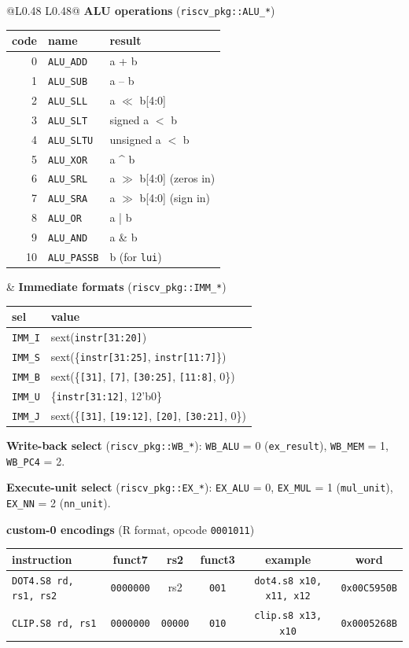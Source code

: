 \documentclass[10pt]{article}
\newcommand{\sv}[1]{\texttt{#1}}
\begin{document}
\bigskip
\noindent\begin{tabular}{@{}L{0.48\linewidth} L{0.48\linewidth}@{}}
\textbf{ALU operations} (\sv{riscv\_pkg::ALU\_*})\par\smallskip
\small
\begin{tabular}{r l l}
\toprule
code & name & result\\ \midrule
0 & \sv{ALU\_ADD}  & a + b\\
1 & \sv{ALU\_SUB}  & a -- b\\
2 & \sv{ALU\_SLL}  & a $\ll$ b[4:0]\\
3 & \sv{ALU\_SLT}  & signed a $<$ b\\
4 & \sv{ALU\_SLTU} & unsigned a $<$ b\\
5 & \sv{ALU\_XOR}  & a \^{} b\\
6 & \sv{ALU\_SRL}  & a $\gg$ b[4:0] (zeros in)\\
7 & \sv{ALU\_SRA}  & a $\gg$ b[4:0] (sign in)\\
8 & \sv{ALU\_OR}   & a | b\\
9 & \sv{ALU\_AND}  & a \& b\\
10& \sv{ALU\_PASSB}& b (for \sv{lui})\\ \bottomrule
\end{tabular}
&
\textbf{Immediate formats} (\sv{riscv\_pkg::IMM\_*})\par\smallskip
\small
\begin{tabular}{l l}
\toprule
sel & value\\ \midrule
\sv{IMM\_I} & sext(\sv{instr[31:20]})\\
\sv{IMM\_S} & sext(\{\sv{instr[31:25]}, \sv{instr[11:7]}\})\\
\sv{IMM\_B} & sext(\{\sv{[31]}, \sv{[7]}, \sv{[30:25]}, \sv{[11:8]}, 0\})\\
\sv{IMM\_U} & \{\sv{instr[31:12]}, 12'b0\}\\
\sv{IMM\_J} & sext(\{\sv{[31]}, \sv{[19:12]}, \sv{[20]}, \sv{[30:21]}, 0\})\\ \bottomrule
\end{tabular}

\bigskip
\textbf{Write-back select} (\sv{riscv\_pkg::WB\_*}): \sv{WB\_ALU} = 0 (\sv{ex\_result}), \sv{WB\_MEM} = 1, \sv{WB\_PC4} = 2.\par
\textbf{Execute-unit select} (\sv{riscv\_pkg::EX\_*}): \sv{EX\_ALU} = 0, \sv{EX\_MUL} = 1 (\sv{mul\_unit}), \sv{EX\_NN} = 2 (\sv{nn\_unit}).

\bigskip
\textbf{custom-0 encodings} (R format, opcode \sv{0001011})\par\smallskip
\small
\begin{tabular}{l c c c c c}
\toprule
instruction & funct7 & rs2 & funct3 & example & word\\ \midrule
\sv{DOT4.S8 rd, rs1, rs2} & \sv{0000000} & rs2 & \sv{001} & \sv{dot4.s8 x10, x11, x12} & \sv{0x00C5950B}\\
\sv{CLIP.S8 rd, rs1}      & \sv{0000000} & \sv{00000} & \sv{010} & \sv{clip.s8 x13, x10} & \sv{0x0005268B}\\ \bottomrule
\end{tabular}
\end{tabular}
\end{document}
